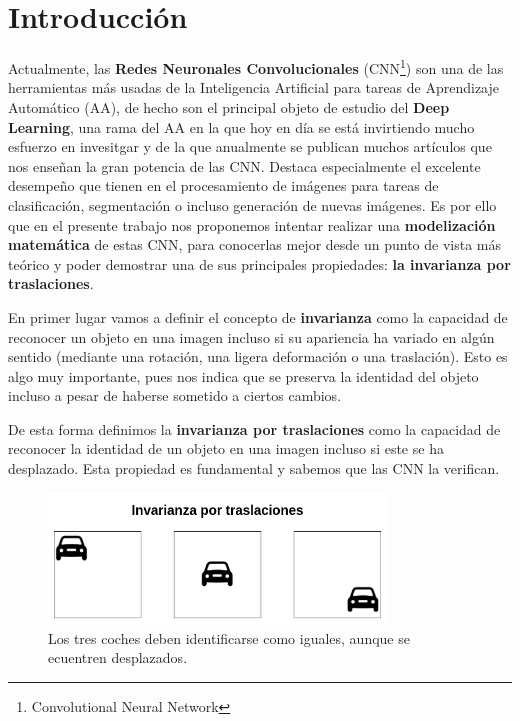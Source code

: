 

\chapter{Introducción}

\noindent Actualmente, las \textbf{Redes Neuronales Convolucionales} (CNN\footnote{Convolutional Neural Network}) son una de las herramientas más usadas de la Inteligencia Artificial para tareas de Aprendizaje Automático (AA), de hecho son el principal objeto de estudio del \textbf{Deep Learning}, una rama del AA en la que hoy en día se está invirtiendo mucho esfuerzo en invesitgar y de la que anualmente se publican muchos artículos que nos enseñan la gran potencia de las CNN. Destaca especialmente el excelente desempeño que tienen en el procesamiento de imágenes para tareas de clasificación, segmentación o incluso generación de nuevas imágenes. Es por ello que en el presente trabajo nos proponemos intentar realizar una \textbf{modelización matemática} de estas CNN, para conocerlas mejor desde un punto de vista más teórico y poder demostrar una de sus principales propiedades: \textbf{la invarianza por traslaciones}.

\medskip

\noindent En primer lugar vamos a definir el concepto de \textbf{invarianza} como la capacidad de reconocer un objeto en una imagen incluso si su apariencia ha variado en algún sentido (mediante una rotación, una  ligera deformación o una traslación). Esto es algo muy importante, pues nos indica que se preserva la identidad del objeto incluso a pesar de haberse sometido a ciertos cambios.

\medskip

\noindent De esta forma definimos la \textbf{invarianza por traslaciones} como la capacidad de reconocer la identidad de un objeto en una imagen incluso si este se ha desplazado. Esta propiedad es fundamental y sabemos que las CNN la verifican.

\begin{figure} [!h]
    \centering
    \includegraphics[width=0.8\textwidth]{img/translation_invariance.png}
    \caption{Los tres coches deben identificarse como iguales, aunque se ecuentren desplazados.}
    \label{fig:invarianza_traslaciones}
\end{figure}

